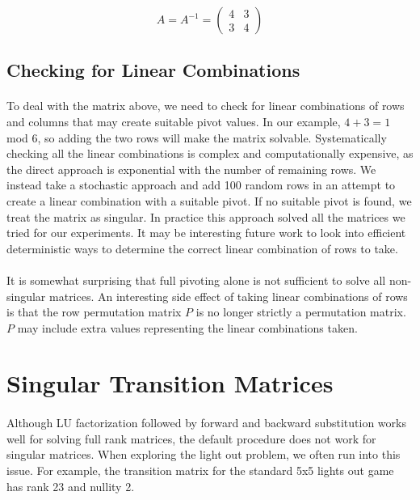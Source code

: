 \documentclass[11pt]{article}
\begin{document}
\[
A = A^{-1} =
\begin{pmatrix}
4 & 3 \\
3 & 4
\end{pmatrix}
\]

\subsection*{Checking for Linear Combinations}

\paragraph{} To deal with the matrix above, we need to check for linear combinations of rows and columns that may create suitable pivot values.  In our example, $4 + 3 = 1$ mod 6, so adding the two rows will make the matrix solvable.  Systematically checking all the linear combinations is complex and computationally expensive, as the direct approach is exponential with the number of remaining rows.  We instead take a stochastic approach and add 100 random rows in an attempt to create a linear combination with a suitable pivot.  If no suitable pivot is found, we treat the matrix as singular.  In practice this approach solved all the matrices we tried for our experiments.  It may be interesting future work to look into efficient deterministic ways to determine the correct linear combination of rows to take.


\paragraph{} It is somewhat surprising that full pivoting alone is not sufficient to solve all non-singular matrices.  An interesting side effect of taking linear combinations of rows is that the row permutation matrix $P$ is no longer strictly a permutation matrix.  $P$ may include extra values representing the linear combinations taken.

\section*{Singular Transition Matrices}

\paragraph{} Although LU factorization followed by forward and backward substitution works well for solving full rank matrices, the default procedure does not work for singular matrices.  When exploring the light out problem, we often run into this issue.  For example, the transition matrix for the standard 5x5 lights out game has rank 23 and nullity 2.
\end{document}
